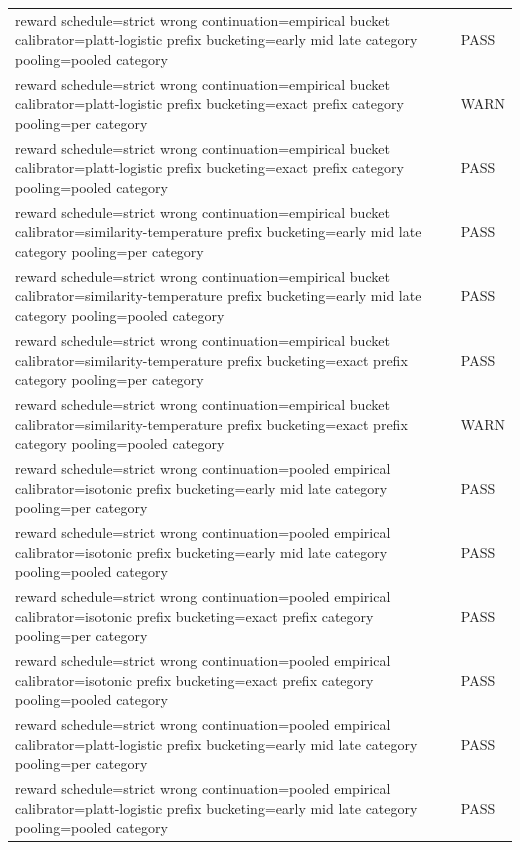 \begin{table}[h]
\begin{tabular}{ll}
reward schedule=strict wrong  continuation=empirical bucket  calibrator=platt-logistic  prefix bucketing=early mid late  category pooling=pooled category & PASS \\
reward schedule=strict wrong  continuation=empirical bucket  calibrator=platt-logistic  prefix bucketing=exact prefix  category pooling=per category & WARN \\
reward schedule=strict wrong  continuation=empirical bucket  calibrator=platt-logistic  prefix bucketing=exact prefix  category pooling=pooled category & PASS \\
reward schedule=strict wrong  continuation=empirical bucket  calibrator=similarity-temperature  prefix bucketing=early mid late  category pooling=per category & PASS \\
reward schedule=strict wrong  continuation=empirical bucket  calibrator=similarity-temperature  prefix bucketing=early mid late  category pooling=pooled category & PASS \\
reward schedule=strict wrong  continuation=empirical bucket  calibrator=similarity-temperature  prefix bucketing=exact prefix  category pooling=per category & PASS \\
reward schedule=strict wrong  continuation=empirical bucket  calibrator=similarity-temperature  prefix bucketing=exact prefix  category pooling=pooled category & WARN \\
reward schedule=strict wrong  continuation=pooled empirical  calibrator=isotonic  prefix bucketing=early mid late  category pooling=per category & PASS \\
reward schedule=strict wrong  continuation=pooled empirical  calibrator=isotonic  prefix bucketing=early mid late  category pooling=pooled category & PASS \\
reward schedule=strict wrong  continuation=pooled empirical  calibrator=isotonic  prefix bucketing=exact prefix  category pooling=per category & PASS \\
reward schedule=strict wrong  continuation=pooled empirical  calibrator=isotonic  prefix bucketing=exact prefix  category pooling=pooled category & PASS \\
reward schedule=strict wrong  continuation=pooled empirical  calibrator=platt-logistic  prefix bucketing=early mid late  category pooling=per category & PASS \\
reward schedule=strict wrong  continuation=pooled empirical  calibrator=platt-logistic  prefix bucketing=early mid late  category pooling=pooled category & PASS \\

\end{tabular}
\end{table}
